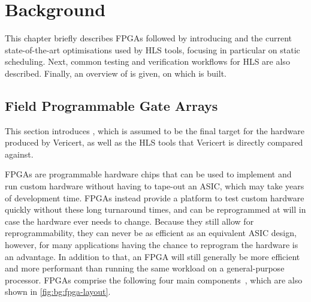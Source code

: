 \chapter{Background}%
\label{sec:background}

\begin{chapsummary}
  This chapter briefly describes \glspl{FPGA} followed by introducing
   and the current state-of-the-art optimisations used by
  \gls{HLS} tools, focusing in particular on static scheduling.  Next, common
  testing and verification workflows for \gls{HLS} are also described.  Finally,
  an overview of \compcert{} is given, on which \vericert{} is built.
\end{chapsummary}


\section{Field Programmable Gate Arrays}%
\label{sec:bg:fpga}

This section introduces , which is assumed to be the final
target for the hardware produced by Vericert, as well as the \gls{HLS} tools
that Vericert is directly compared against.

\Glspl{FPGA} are programmable hardware chips that can be used to implement and
run custom hardware without having to tape-out an \gls{ASIC}, which may take
years of development time.  \Glspl{FPGA} instead provide a platform to test
custom hardware quickly without these long turnaround times, and can be
reprogrammed at will in case the hardware ever needs to change.  Because they
still allow for reprogrammability, they can never be as efficient as an
equivalent \gls{ASIC} design, however, for many applications having the chance
to reprogram the hardware is an advantage.  In addition to that, an \gls{FPGA}
will still generally be more efficient and more performant than running the same
workload on a general-purpose processor.  \Glspl{FPGA} comprise the following
four main components~\cite{boutros21_fpga_archit}, which are also shown in
\cref{fig:bg:fpga-layout}.

